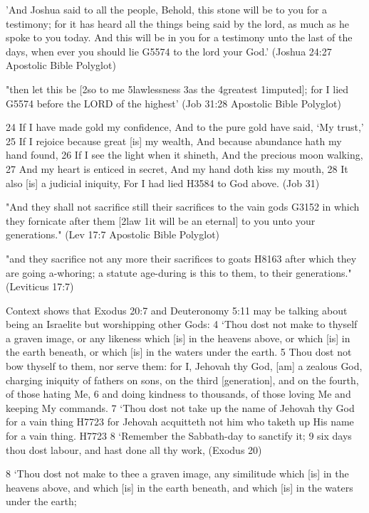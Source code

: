 \documentclass[11pt]{article}
\begin{document}
'And Joshua said to all the people, Behold, this stone will be to you for a testimony; for it has heard all the things being said by the lord, as much as he spoke to you today. And this will be in you for a testimony unto the last of the days, when ever you should lie G5574 to the lord your God.' (Joshua 24:27 Apostolic Bible Polyglot)\newline

"then let this be [2so to me 5lawlessness 3as the 4greatest 1imputed]; for I lied G5574 before the LORD of the highest'
(Job 31:28 Apostolic Bible Polyglot)

24 If I have made gold my confidence, And to the pure gold have said, `My trust,'
25 If I rejoice because great [is] my wealth, And because abundance hath my hand found,
26 If I see the light when it shineth, And the precious moon walking,
27 And my heart is enticed in secret, And my hand doth kiss my mouth,
28 It also [is] a judicial iniquity, For I had lied H3584 to God above.
(Job 31)


"And they shall not sacrifice still their sacrifices to the vain gods G3152 in which they fornicate after them [2law 1it will be an eternal] to you unto your generations." (Lev 17:7 Apostolic Bible Polyglot)\newline

"and they sacrifice not any more their sacrifices to goats H8163 after which they are going a-whoring; a statute age-during is this to them, to their generations." (Leviticus 17:7)\newline

Context shows that Exodus 20:7 and Deuteronomy 5:11 may be talking about being an Israelite but worshipping other Gods:
4 `Thou dost not make to thyself a graven image, or any likeness which [is] in the heavens above, or which [is] in the earth beneath, or which [is] in the waters under the earth.
5 Thou dost not bow thyself to them, nor serve them: for I, Jehovah thy God, [am] a zealous God, charging iniquity of fathers on sons, on the third [generation], and on the fourth, of those hating Me,
6 and doing kindness to thousands, of those loving Me and keeping My commands.
7 `Thou dost not take up the name of Jehovah thy God for a vain thing H7723 for Jehovah acquitteth not him who taketh up His name for a vain thing. H7723 8 `Remember the Sabbath-day to sanctify it; 9 six days thou dost labour, and hast done all thy work,
(Exodus 20)\newline

8 `Thou dost not make to thee a graven image, any similitude which [is] in the heavens above, and which [is] in the earth beneath, and which [is] in the waters under the earth;
\end{document}
